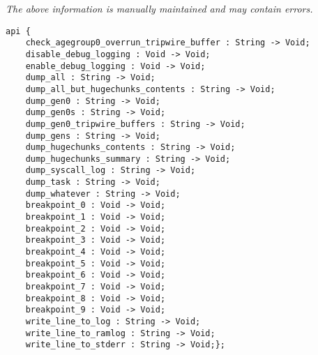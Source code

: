 \label{api:Heap\_Debug}

{\tiny \it The above information is manually maintained and may contain errors.}
\begin{verbatim}
api {
    check_agegroup0_overrun_tripwire_buffer : String -> Void;
    disable_debug_logging : Void -> Void;
    enable_debug_logging : Void -> Void;
    dump_all : String -> Void;
    dump_all_but_hugechunks_contents : String -> Void;
    dump_gen0 : String -> Void;
    dump_gen0s : String -> Void;
    dump_gen0_tripwire_buffers : String -> Void;
    dump_gens : String -> Void;
    dump_hugechunks_contents : String -> Void;
    dump_hugechunks_summary : String -> Void;
    dump_syscall_log : String -> Void;
    dump_task : String -> Void;
    dump_whatever : String -> Void;
    breakpoint_0 : Void -> Void;
    breakpoint_1 : Void -> Void;
    breakpoint_2 : Void -> Void;
    breakpoint_3 : Void -> Void;
    breakpoint_4 : Void -> Void;
    breakpoint_5 : Void -> Void;
    breakpoint_6 : Void -> Void;
    breakpoint_7 : Void -> Void;
    breakpoint_8 : Void -> Void;
    breakpoint_9 : Void -> Void;
    write_line_to_log : String -> Void;
    write_line_to_ramlog : String -> Void;
    write_line_to_stderr : String -> Void;};
\end{verbatim}
